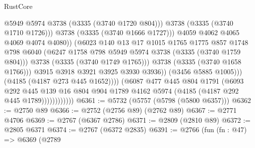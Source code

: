 \begin{lexlean}{RustCore}
\begin{coremodule}
                                            @5949
                                            @5974
                                            @3738
                                            (@3335 (@3740 @1720 @804)))
                                          @3738
                                          (@3335 (@3740 @1710 @1726)))
                                        @3738
                                        (@3335 (@3740 @1666 @1727)))
                                      @4059
                                      @4062
                                      @4065
                                      @4069
                                      @4074
                                      @4080))
                                  (@6023
                                    @140
                                    @13
                                    @17
                                    @1015
                                    @1765
                                    @1775
                                    @857
                                    @1748
                                    @798
                                    @6040
                                    (@6247 @1758 @798 @5949 @5974 @3738 (@3335 (@3740 @1759 @804)))
                                    @3738
                                    (@3335 (@3740 @1749 @1765)))
                                  @3738
                                  (@3335 (@3740 @1658 @1766)))
                                @3915
                                @3918
                                @3921
                                @3925
                                @3930
                                @3936))
                            (@3456 @5885 @1005)))
                        (@4185 (@4187 @273 @445 @1652))))
                    (@6087
                      @477
                      @445
                      @804
                      @1791
                      (@6093
                        @292
                        @445
                        @139
                        @16
                        @804
                        @904
                        @1789
                        @4162
                        @5974
                        (@4185 (@4187 @292 @445 @1789))))))))))))
@6361 := @5732 (@5757 (@5798 (@5800 @6357)))
@6362 := @2750 @89
@6366 := @2752 (@2756 @89) (@2762 @89)
@6367 := @2771 @4706
@6369 := @2767 (@6367 @2786)
@6371 := @2809 (@2810 @89)
@6372 := @2805 @6371
@6374 := @2767 (@6372 @2835)
@6391 := @2766
    (fun (fn : @47) =>
    @6369
      (@2789

\end{coremodule}
\end{lexlean}
